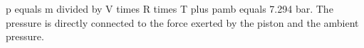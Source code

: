 p equals m divided by V times R times T plus pamb equals 7.294 bar.  
The pressure is directly connected to the force exerted by the piston and the ambient pressure.